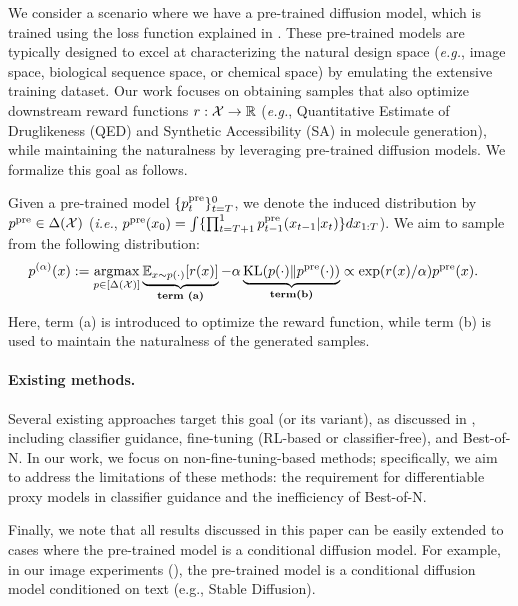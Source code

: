 We consider a scenario where we have a pre-trained diffusion model, which is trained using the loss function explained in . These pre-trained models are typically designed to excel at characterizing the natural design space (\textit{e.g.}, image space, biological sequence space, or chemical space) by emulating the extensive training dataset. Our work focuses on obtaining samples that also optimize downstream reward functions $r:\mathcal{X} \to \mathbb{R}$ (\textit{e.g.}, Quantitative Estimate of Druglikeness (QED) and Synthetic Accessibility (SA) in molecule generation), while maintaining the naturalness by leveraging pre-trained diffusion models. We formalize this goal as follows. 

Given a pre-trained model $\{p^{\mathrm{pre}}_t\}_{t=T}^0$, we denote the induced distribution by $p^{\mathrm{pre}} \in \Delta(\mathcal{X})$ (\textit{i.e.}, $p^{\mathrm{pre}}(x_0)= \int \{ \prod_{t=T+1}^1 p^{\mathrm{pre}}_{t-1}(x_{t-1}|x_t)\}dx_{1:T}$). We aim to sample from the following distribution: 
\begin{align*}
 p^{(\alpha)}(x)& :=   \mathop{\mathrm{argmax}}_{p\in [\Delta(\mathcal{X})] }\underbrace{\mathbb{E}_{x\sim p(\cdot)}[r(x)]}_{\textbf{term (a)}}-\alpha \underbrace{\mathrm{KL}( p(\cdot) \| p^{\mathrm{pre}}(\cdot))}_{\textbf{term(b)}} \propto \exp(r(x)/\alpha)p^{\mathrm{pre}}(x). 
\end{align*}
Here, term (a) is introduced to optimize the reward function, while term (b) is used to maintain the naturalness of the generated samples. 

\vspace{-2mm}
\paragraph{Existing methods.}


Several existing approaches target this goal (or its variant), as discussed in , including classifier guidance, fine-tuning (RL-based or classifier-free), and Best-of-N. In our work, we focus on non-fine-tuning-based methods; specifically, we aim to address the limitations of these methods: the requirement for differentiable proxy models in classifier guidance and the inefficiency of Best-of-N.

Finally, we note that all results discussed in this paper can be easily extended to cases where the pre-trained model is a conditional diffusion model. For example, in our image experiments (), the pre-trained model is a conditional diffusion model conditioned on text (e.g., Stable Diffusion).





